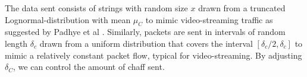 \documentclass[runningheads]{llncs}\usepackage[]{graphicx}\usepackage[]{color}
\begin{document}


The data sent consists of strings with random size $x$ drawn from a truncated Lognormal-distribution with mean $\mu_C$ to mimic video-streaming traffic as suggested by Padhye et al \cite{padhye2010evading}. Similarly, packets are sent in intervals of random length $\delta_c$ drawn from a uniform distribution that covers the interval $[\delta_c/2,\delta_c]$ to mimic a relatively constant packet flow, typical for video-streaming. By adjusting $\delta_C$, we can control the amount of chaff sent. 



 






\end{document}
